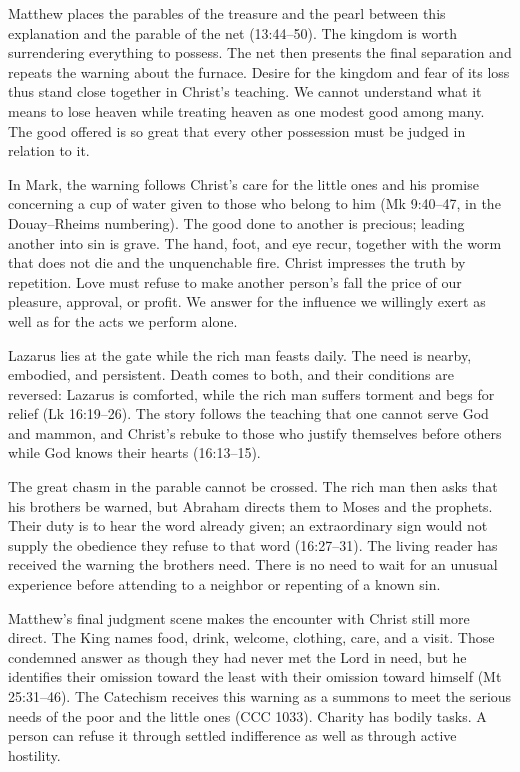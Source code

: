 Matthew places the parables of the treasure and the pearl between this explanation and the parable of the net (13:44--50). The kingdom is worth surrendering everything to possess. The net then presents the final separation and repeats the warning about the furnace. Desire for the kingdom and fear of its loss thus stand close together in Christ's teaching. We cannot understand what it means to lose heaven while treating heaven as one modest good among many. The good offered is so great that every other possession must be judged in relation to it.

In Mark, the warning follows Christ's care for the little ones and his promise concerning a cup of water given to those who belong to him (Mk 9:40--47, in the Douay--Rheims numbering). The good done to another is precious; leading another into sin is grave. The hand, foot, and eye recur, together with the worm that does not die and the unquenchable fire. Christ impresses the truth by repetition. Love must refuse to make another person's fall the price of our pleasure, approval, or profit. We answer for the influence we willingly exert as well as for the acts we perform alone.

Lazarus lies at the gate while the rich man feasts daily. The need is nearby, embodied, and persistent. Death comes to both, and their conditions are reversed: Lazarus is comforted, while the rich man suffers torment and begs for relief (Lk 16:19--26). The story follows the teaching that one cannot serve God and mammon, and Christ's rebuke to those who justify themselves before others while God knows their hearts (16:13--15).

The great chasm in the parable cannot be crossed. The rich man then asks that his brothers be warned, but Abraham directs them to Moses and the prophets. Their duty is to hear the word already given; an extraordinary sign would not supply the obedience they refuse to that word (16:27--31). The living reader has received the warning the brothers need. There is no need to wait for an unusual experience before attending to a neighbor or repenting of a known sin.

Matthew's final judgment scene makes the encounter with Christ still more direct. The King names food, drink, welcome, clothing, care, and a visit. Those condemned answer as though they had never met the Lord in need, but he identifies their omission toward the least with their omission toward himself (Mt 25:31--46). The Catechism receives this warning as a summons to meet the serious needs of the poor and the little ones (CCC 1033). Charity has bodily tasks. A person can refuse it through settled indifference as well as through active hostility.

